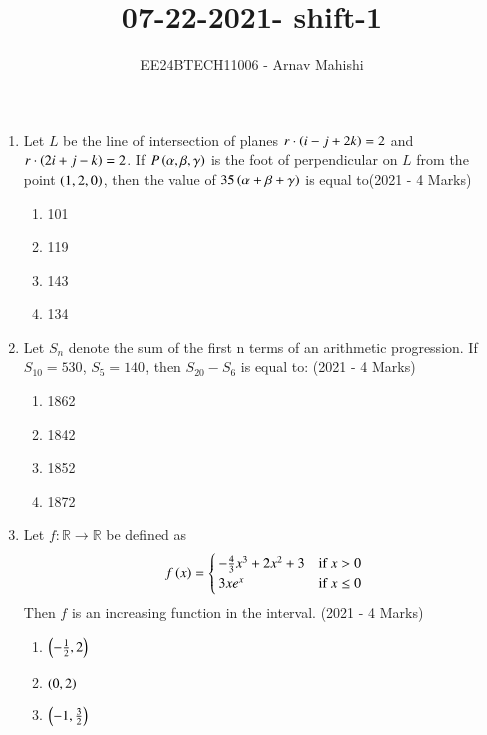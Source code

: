 \documentclass[journal]{IEEEtran}
\begin{document}

\vspace{3cm}

\title{07-22-2021- shift-1}
\author{EE24BTECH11006 - Arnav Mahishi}
{\let\newpage\relax\maketitle}
\begin{enumerate}
\item{
Let $L$ be the line of intersection of planes $r\cdot\left(i-j+2k\right) = 2$ and $r \cdot\left(2i + j - k\right) = 2$. If $P\left(\alpha, \beta, \gamma\right)$ is the foot of perpendicular on $L$ from the point $\left(1, 2, 0\right)$, then the value of $35\left(\alpha + \beta + \gamma\right)$ is equal to\hfill{(2021 - 4 Marks)}
\begin{multicols}{4}
\begin{enumerate}
\item101
\item119
\item143
\item134
\end{enumerate}
\end{multicols}
}
\item{
Let $S_n$ denote the sum of the first n terms of an arithmetic progression. If $S_{10} = 530$, $S_5 = 140$, then 
$S_{20} - S_6$ is equal to:
\hfill{(2021 - 4 Marks)}
\begin{multicols}{4}
\begin{enumerate}
\item 1862
\item 1842
\item 1852
\item 1872
\end{enumerate}
\end{multicols}}
\item{
Let $f : \mathbb{R} \rightarrow \mathbb{R}$ be defined as
\[ f\left(x\right) = \begin{cases} 
-\frac{4}{3}x^3 + 2x^2 + 3 & \text{if } x > 0 \\
3xe^x & \text{if } x \leq 0 
\end{cases} \]
Then $f$ is an increasing function in the interval.
\hfill
{(2021 - 4 Marks)}
\begin{multicols}{4}
\begin{enumerate}
\item $\left(-\frac{1}{2}, 2\right)$
\item $\left(0,2\right)$
\item $\left(-1,\frac{3}{2}\right)$

\end{enumerate}
\end{multicols}}
\end{enumerate}
\end{document}
